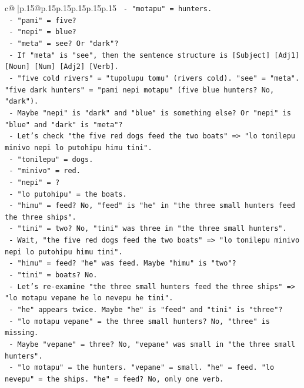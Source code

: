 \documentclass{article}
\begin{document}
{\begin{supertabular}{c@{$\;$}|p{.15\linewidth}@{}p{.15\linewidth}p{.15\linewidth}p{.15\linewidth}p{.15\linewidth}p{.15\linewidth}}
{{{\texttt{     {-} "motapu" = hunters.} \\
\texttt{     {-} "pami" = five?} \\
\texttt{     {-} "nepi" = blue?} \\
\texttt{     {-} "meta" = see? Or "dark"?} \\
\texttt{     {-} If "meta" is "see", then the sentence structure is {[}Subject{]} {[}Adj1{]} {[}Noun{]} {[}Num{]} {[}Adj2{]} {[}Verb{]}.} \\
\texttt{     {-} "five cold rivers" = "tupolupu tomu" (rivers cold). "see" = "meta". "five dark hunters" = "pami nepi motapu" (five blue hunters? No, "dark").} \\
\texttt{     {-} Maybe "nepi" is "dark" and "blue" is something else? Or "nepi" is "blue" and "dark" is "meta"?} \\
\texttt{     {-} Let's check "the five red dogs feed the two boats" => "lo tonilepu minivo nepi lo putohipu himu tini".} \\
\texttt{       {-} "tonilepu" = dogs.} \\
\texttt{       {-} "minivo" = red.} \\
\texttt{       {-} "nepi" = ?} \\
\texttt{       {-} "lo putohipu" = the boats.} \\
\texttt{       {-} "himu" = feed? No, "feed" is "he" in "the three small hunters feed the three ships".} \\
\texttt{       {-} "tini" = two? No, "tini" was three in "the three small hunters".} \\
\texttt{       {-} Wait, "the five red dogs feed the two boats" => "lo tonilepu minivo nepi lo putohipu himu tini".} \\
\texttt{       {-} "himu" = feed? "he" was feed. Maybe "himu" is "two"?} \\
\texttt{       {-} "tini" = boats? No.} \\
\texttt{       {-} Let's re{-}examine "the three small hunters feed the three ships" => "lo motapu vepane he lo nevepu he tini".} \\
\texttt{         {-} "he" appears twice. Maybe "he" is "feed" and "tini" is "three"?} \\
\texttt{         {-} "lo motapu vepane" = the three small hunters? No, "three" is missing.} \\
\texttt{         {-} Maybe "vepane" = three? No, "vepane" was small in "the three small hunters".} \\
\texttt{         {-} "lo motapu" = the hunters. "vepane" = small. "he" = feed. "lo nevepu" = the ships. "he" = feed? No, only one verb.} \\
}}}
\end{supertabular}}
\end{document}
